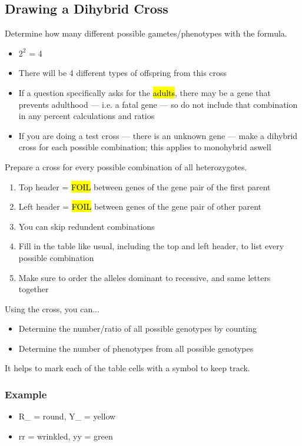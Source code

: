 \documentclass[a4paper,12pt]{article}
\begin{document}
\subsection{Drawing a Dihybrid Cross}
Determine how many different possible gametes/phenotypes with the formula.
\begin{itemize}
    \item{$2^2$ = 4}
    \item{There will be 4 different types of offspring from this cross}
    \item{If a question specifically asks for the \hl{adults}, there may be a gene that prevents adulthood --- i.e. a fatal gene --- so do not include that combination in any percent calculations and ratios}
    \item{If you are doing a test cross --- there is an unknown gene --- make a dihybrid cross for each possible combination; this applies to monohybrid aswell}
        \\
\end{itemize}

\pagebreak

Prepare a cross for every possible combination of all heterozygotes.
\begin{enumerate}
    \item{Top header = \hl{FOIL} between genes of the gene pair of the first parent}
    \item{Left header = \hl{FOIL} between genes of the gene pair of other parent}
    \item{You can skip redundent combinations}
    \item{Fill in the table like usual, including the top and left header, to list every possible combination}
    \item{Make sure to order the alleles dominant to recessive, and same letters together}
\end{enumerate}

Using the cross, you can...
\begin{itemize}
    \item{Determine the number/ratio of all possible genotypes by counting}
    \item{Determine the number of phenotypes from all possible genotypes}
\end{itemize}
It helps to mark each of the table cells with a symbol to keep track.

\subsubsection{Example}
\begin{itemize}
    \item{R\_ = round, Y\_ = yellow}
    \item{rr = wrinkled, yy = green}
\end{itemize}
\end{document}
